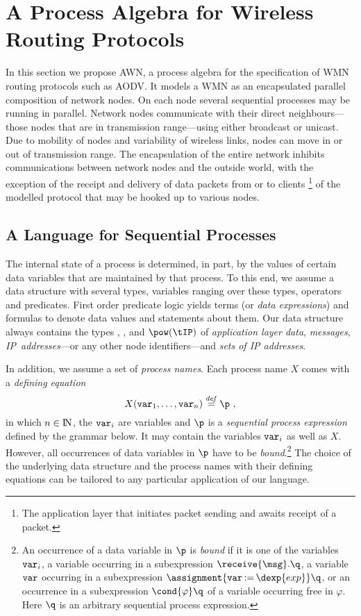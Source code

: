 \documentclass[envcountsame,envcountsect,orivec,runningheads]{llncs}
\newcommand{\awn}{AWN\xspace}
\newcommand{\NN}{\ensuremath{\mathop{\rm I\mkern-2.5mu N}\nolimits }}
\renewcommand{\keyw}[1]{\ensuremath{{\tt #1}}}
\begin{document}
\section{A Process Algebra for Wireless Routing Protocols}\label{sec:process_algebra}
In this section we propose \awn, a process algebra for the specification of WMN routing
protocols such as AODV\@. It models a WMN as an encapsulated
parallel composition of network nodes. On each node several sequential
processes may be running in parallel.  Network nodes communicate with
their direct neighbours---those nodes that are in transmission
range---using either broadcast or unicast.  Due to mobility of nodes and 
variability of wireless links, nodes can move in or out of transmission
range. The encapsulation of the entire network inhibits communications 
between network nodes and the outside world, with the exception of the 
receipt and delivery of data packets from or to clients
\footnote{The application layer that initiates packet sending
  and awaits receipt of a packet.}  of the modelled protocol that may
be hooked up to various nodes.

\subsection{A Language for Sequential Processes}
The internal state of a process is determined, in part, by the values
of certain data variables that are maintained by that process.  To
this end, we assume a data structure with several types, variables
ranging over these types, operators and predicates.  First order
predicate logic yields terms (or \emph{data expressions}) and formulas
to denote data values and statements about them. Our data structure
always contains the types \tDATA, \tMSG, {\tIP} and $\pow(\tIP)$ of
\emph{application layer data}, \emph{messages}, \mbox{\emph{IP addresses}}---or any
other node identifiers---and \emph{sets of IP addresses}.

In addition, we assume a set of \emph{process names}.
Each process name $X$ comes with a \emph{defining equation}
\vspace{-2ex}
\[
X(\keyw{var}_1,\ldots,\keyw{var}_n) \stackrel{{\it def}}{=} \p\ ,
\]
in which $n\in\NN$, the $\keyw{var}_i$ are variables and $\p$ is a
\emph{sequential process expression} defined by the grammar below. It
may contain the variables $\keyw{var}_i$ as well as $X$. However, all
occurrences of data variables in $\p$ have to be
\emph{bound}.\footnote{An occurrence of a data variable in $\p$ is
  \emph{bound} if it is one of the variables $\keyw{var}_i$, a
  variable {\msg} occurring in a subexpression $\receive{\msg}.\q$, a
  variable \keyw{var} occurring in a subexpression
  $\assignment{\keyw{var}\mathop{:=}\dexp{exp}}\q$, or an occurrence
  in a subexpression $\cond{\varphi}\q$ of a variable occurring free
  in $\varphi$.  Here $\q$ is an arbitrary sequential process
  expression.}  The choice of the underlying data structure and the
process names with their defining equations can be tailored to any
particular application of our language.
\end{document}
